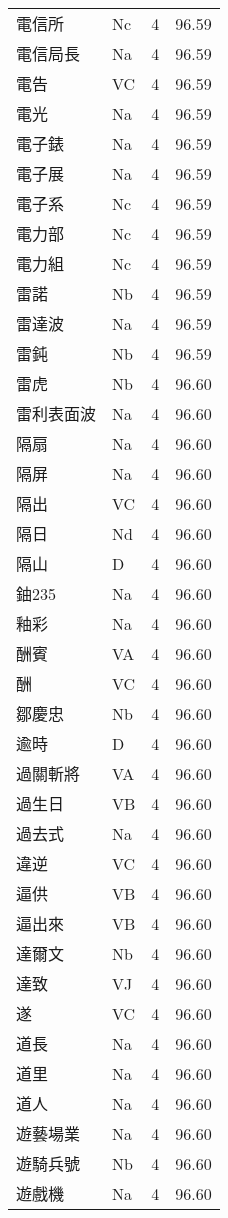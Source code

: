 \documentclass[twocolumn]{book}
\begin{document}
\begin{supertabular}{llrr}
電信所 & Nc & 4 &  96.59\\
電信局長 & Na & 4 &  96.59\\
電告 & VC & 4 &  96.59\\
電光 & Na & 4 &  96.59\\
電子錶 & Na & 4 &  96.59\\
電子展 & Na & 4 &  96.59\\
電子系 & Nc & 4 &  96.59\\
電力部 & Nc & 4 &  96.59\\
電力組 & Nc & 4 &  96.59\\
雷諾 & Nb & 4 &  96.59\\
雷達波 & Na & 4 &  96.59\\
雷鈍 & Nb & 4 &  96.59\\
雷虎 & Nb & 4 &  96.60\\
雷利表面波 & Na & 4 &  96.60\\
隔扇 & Na & 4 &  96.60\\
隔屏 & Na & 4 &  96.60\\
隔出 & VC & 4 &  96.60\\
隔日 & Nd & 4 &  96.60\\
隔山 & D & 4 &  96.60\\
鈾235 & Na & 4 &  96.60\\
釉彩 & Na & 4 &  96.60\\
酬賓 & VA & 4 &  96.60\\
酬 & VC & 4 &  96.60\\
鄒慶忠 & Nb & 4 &  96.60\\
逾時 & D & 4 &  96.60\\
過關斬將 & VA & 4 &  96.60\\
過生日 & VB & 4 &  96.60\\
過去式 & Na & 4 &  96.60\\
違逆 & VC & 4 &  96.60\\
逼供 & VB & 4 &  96.60\\
逼出來 & VB & 4 &  96.60\\
達爾文 & Nb & 4 &  96.60\\
達致 & VJ & 4 &  96.60\\
遂 & VC & 4 &  96.60\\
道長 & Na & 4 &  96.60\\
道里 & Na & 4 &  96.60\\
道人 & Na & 4 &  96.60\\
遊藝場業 & Na & 4 &  96.60\\
遊騎兵號 & Nb & 4 &  96.60\\
遊戲機 & Na & 4 &  96.60\\

\end{supertabular}
\end{document}
